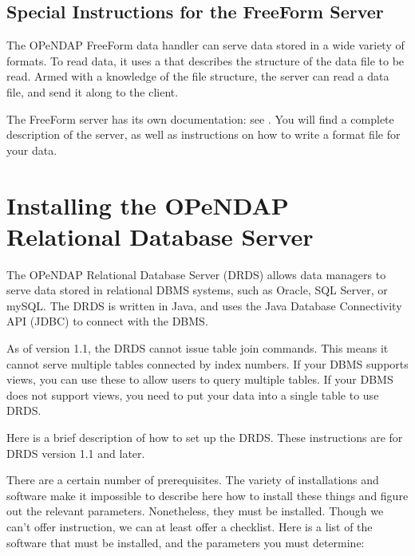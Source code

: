 \documentclass{dods-book}
\begin{document}
\section{Special Instructions for the FreeForm Server}

The OPeNDAP FreeForm data handler can serve data stored in a wide variety of
formats.  To read data, it uses a  that describes the
structure of the data file to be read.  Armed with a knowledge of the
file structure, the server can read a data file, and send it along to
the client.

The FreeForm server has its own documentation: see \DODSffbook .  You
will find a complete description of the server, as well as
instructions on how to write a format file for your data.



\chapter{Installing the OPeNDAP Relational Database Server}
\label{server,java}

The OPeNDAP Relational Database Server (DRDS) allows data managers to
serve data stored in relational DBMS systems, such as Oracle, SQL
Server, or mySQL.  The DRDS is written in Java, and uses the Java
Database Connectivity API (JDBC) to connect with the DBMS.

As of version 1.1, the DRDS cannot issue table join commands.  This
means it cannot serve multiple tables connected by index numbers.  If
your DBMS supports views, you can use these to allow users to query
multiple tables.  If your DBMS does not support views, you need to put
your data into a single table to use DRDS.

Here is a brief description of how to set up the DRDS.  These instructions
are for DRDS version 1.1 and later.

There are a certain number of prerequisites.  The variety of
installations and software make it impossible to describe here how to
install these things and figure out the relevant parameters.
Nonetheless, they must be installed.  Though we can't offer
instruction, we can at least offer a checklist.  Here is a list of the
software that must be installed, and the parameters you must determine:
\end{document}
